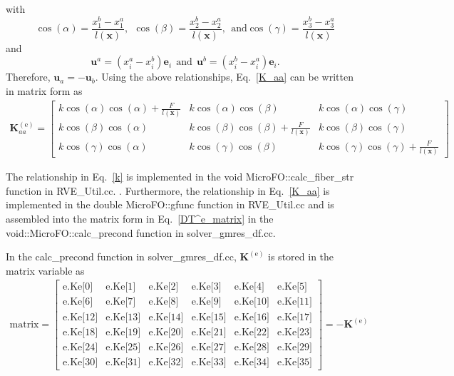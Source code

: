 %
with
%
\begin{equation}
\cos(\alpha) = \frac{x^b_1 - x^a_1}{l(\textbf{x})}, \ \ \cos(\beta) = \frac{x^b_2 - x^a_2}{l(\textbf{x})}, \ \ \text{and} \cos(\gamma) = \frac{x^b_3 - x^a_3}{l(\textbf{x})} 
\end{equation}
%
and
%
\begin{equation}
\textbf{u}^a = (x^a_i - x^b_i) \textbf{e}_i \ \ \text{and} \ \ \textbf{u}^b = (x^b_i - x^a_i) \textbf{e}_i .
\end{equation}
%
Therefore, $\textbf{u}_a = -\textbf{u}_b$. Using the above relationships, Eq.\ \eqref{K_aa} can be written in matrix form as
%
\begin{eqnarray}
\textbf{K}^{(\text{e})}_{aa} =
\begin{bmatrix}
k \cos(\alpha)\cos(\alpha) + \frac{F}{l(\textbf{x})} & k \cos(\alpha)\cos(\beta) & k \cos(\alpha)\cos(\gamma) \\
k \cos(\beta)\cos(\alpha) & k \cos(\beta)\cos(\beta)+ \frac{F}{l(\textbf{x})}  & k \cos(\beta)\cos(\gamma) \\
k \cos(\gamma)\cos(\alpha) & k \cos(\gamma)\cos(\beta) & k \cos(\gamma)\cos(\gamma) + \frac{F}{l(\textbf{x})} 
\end{bmatrix}
\label{K^e_aa_matrix}
\end{eqnarray}
%

The relationship in Eq.\ \eqref{k} is implemented in the void MicroFO::calc\_fiber\_str function in RVE\_Util.cc. . Furthermore, the relationship in Eq.\ \eqref{K_aa} is implemented in the double MicroFO::gfunc function in RVE\_Util.cc and is assembled into the matrix form in Eq.\ \eqref{DT^e_matrix} in the void::MicroFO::calc\_precond function in solver\_gmres\_df.cc.

In the calc\_precond function in solver\_gmres\_df.cc, $\textbf{K}^{(\text{e})}$ is stored in the matrix variable as
%
\begin{eqnarray}
\text{matrix} =
\begin{bmatrix}
\text{e.Ke[0]} & \text{e.Ke[1]} & \text{e.Ke[2]} & \text{e.Ke[3]} & \text{e.Ke[4]} & \text{e.Ke[5]} \\
\text{e.Ke[6]} & \text{e.Ke[7]} & \text{e.Ke[8]} & \text{e.Ke[9]} & \text{e.Ke[10]} & \text{e.Ke[11]} \\
\text{e.Ke[12]} & \text{e.Ke[13]} & \text{e.Ke[14]} & \text{e.Ke[15]} & \text{e.Ke[16]} & \text{e.Ke[17]} \\
\text{e.Ke[18]} & \text{e.Ke[19]} & \text{e.Ke[20]} & \text{e.Ke[21]} & \text{e.Ke[22]} & \text{e.Ke[23]} \\
\text{e.Ke[24]} & \text{e.Ke[25]} & \text{e.Ke[26]} & \text{e.Ke[27]} & \text{e.Ke[28]} & \text{e.Ke[29]} \\
\text{e.Ke[30]} & \text{e.Ke[31]} & \text{e.Ke[32]} & \text{e.Ke[33]} & \text{e.Ke[34]} & \text{e.Ke[35]} 
\end{bmatrix} = -\textbf{K}^{(\text{e})}
\label{matrix}
\end{eqnarray}
%

